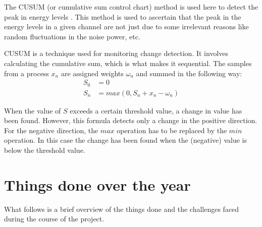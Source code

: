 The CUSUM (or cumulative sum control chart) method is used here to detect 
the peak in energy levels \cite{wikiCUSUM}. This method is used to ascertain 
that the peak in the energy levels in a given channel are not just due to some
irrelevant reasons like random fluctuations in the noise power, etc.
 
CUSUM is a technique used for monitoring change detection. It involves 
calculating the cumulative sum, which is what makes it sequential. The samples
from a process $x_n$ are assigned weights $\omega_n$ and summed in the 
following way:
\begin{align}
    S_0 &= 0 \nonumber \\
    S_n &= max(0, S_n + x_n - \omega_n) \nonumber
\end{align}

When the value of $S$ exceeds a certain threshold value, a change in value has 
been found. However, this formula detects only a change in the positive 
direction. For the negative direction, the $max$ operation has to be replaced 
by the $min$ operation. In this case the change has been found when the 
(negative) value is below the threshold value.


\section{Things done over the year}

What follows is a brief overview of the things done and the challenges faced 
during the course of the project.

